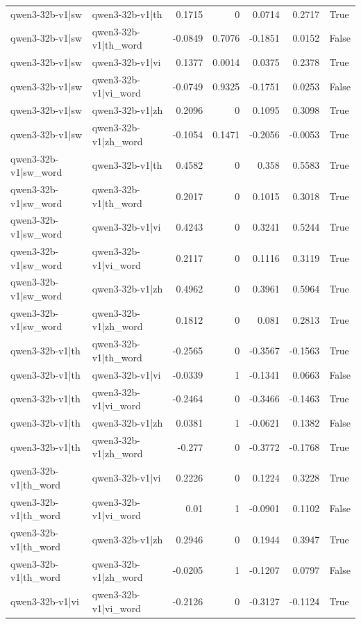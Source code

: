 \begin{table}
\begin{tabular}{l l r r r r l}
qwen3-32b-v1|sw & qwen3-32b-v1|th & 0.1715 & 0 & 0.0714 & 0.2717 & True \\
qwen3-32b-v1|sw & qwen3-32b-v1|th_word & -0.0849 & 0.7076 & -0.1851 & 0.0152 & False \\
qwen3-32b-v1|sw & qwen3-32b-v1|vi & 0.1377 & 0.0014 & 0.0375 & 0.2378 & True \\
qwen3-32b-v1|sw & qwen3-32b-v1|vi_word & -0.0749 & 0.9325 & -0.1751 & 0.0253 & False \\
qwen3-32b-v1|sw & qwen3-32b-v1|zh & 0.2096 & 0 & 0.1095 & 0.3098 & True \\
qwen3-32b-v1|sw & qwen3-32b-v1|zh_word & -0.1054 & 0.1471 & -0.2056 & -0.0053 & True \\
qwen3-32b-v1|sw_word & qwen3-32b-v1|th & 0.4582 & 0 & 0.358 & 0.5583 & True \\
qwen3-32b-v1|sw_word & qwen3-32b-v1|th_word & 0.2017 & 0 & 0.1015 & 0.3018 & True \\
qwen3-32b-v1|sw_word & qwen3-32b-v1|vi & 0.4243 & 0 & 0.3241 & 0.5244 & True \\
qwen3-32b-v1|sw_word & qwen3-32b-v1|vi_word & 0.2117 & 0 & 0.1116 & 0.3119 & True \\
qwen3-32b-v1|sw_word & qwen3-32b-v1|zh & 0.4962 & 0 & 0.3961 & 0.5964 & True \\
qwen3-32b-v1|sw_word & qwen3-32b-v1|zh_word & 0.1812 & 0 & 0.081 & 0.2813 & True \\
qwen3-32b-v1|th & qwen3-32b-v1|th_word & -0.2565 & 0 & -0.3567 & -0.1563 & True \\
qwen3-32b-v1|th & qwen3-32b-v1|vi & -0.0339 & 1 & -0.1341 & 0.0663 & False \\
qwen3-32b-v1|th & qwen3-32b-v1|vi_word & -0.2464 & 0 & -0.3466 & -0.1463 & True \\
qwen3-32b-v1|th & qwen3-32b-v1|zh & 0.0381 & 1 & -0.0621 & 0.1382 & False \\
qwen3-32b-v1|th & qwen3-32b-v1|zh_word & -0.277 & 0 & -0.3772 & -0.1768 & True \\
qwen3-32b-v1|th_word & qwen3-32b-v1|vi & 0.2226 & 0 & 0.1224 & 0.3228 & True \\
qwen3-32b-v1|th_word & qwen3-32b-v1|vi_word & 0.01 & 1 & -0.0901 & 0.1102 & False \\
qwen3-32b-v1|th_word & qwen3-32b-v1|zh & 0.2946 & 0 & 0.1944 & 0.3947 & True \\
qwen3-32b-v1|th_word & qwen3-32b-v1|zh_word & -0.0205 & 1 & -0.1207 & 0.0797 & False \\
qwen3-32b-v1|vi & qwen3-32b-v1|vi_word & -0.2126 & 0 & -0.3127 & -0.1124 & True \\

\end{tabular}
\end{table}
